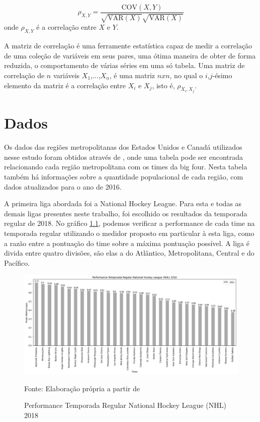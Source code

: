 \documentclass[12pt,oneside,a4paper,chapter=TITLE,english,brazil,sumario=abnt-6027-2012]{abntex2}
\begin{document}
	\begin{equation}
		\rho_{X,Y} = \frac{\mbox{COV}(X,Y)}{\sqrt{\mbox{VAR}(X)}\sqrt{\mbox{VAR}(X)}}
		\label{corr}
	\end{equation}
	onde $\rho_{X,Y}$ é a correlação entre $X$ e $Y$.
	
	A matriz de correlação é uma ferramente estatística capaz de medir a correlação de uma coleção de variáveis em seus pares, uma ótima maneira de obter de forma reduzida, o comportamento de várias séries em uma só tabela. Uma matriz de correlação de $n$ variáveis $X_1$,...,$X_n$, é uma matriz $nxn$, no qual o $i$,$j$-ésimo elemento da matriz é a correlação entre $X_i$ e $X_j$, isto é, $\rho_{X_i,X_j}$.
	
	
\chapter{Dados}

	Os dados das regiões metropolitanas dos Estados Unidos e Canadá utilizados nesse estudo foram obtidos através de , onde uma tabela pode ser encontrada relacionando cada região metropolitana com os times da big four. Nesta tabela também há informações sobre a quantidade populacional de cada região, com dados atualizados para o ano de 2016.
	
	A primeira liga abordada foi a National Hockey League. Para esta e todas as demais ligas presentes neste trabalho, foi escolhido os resultados da temporada regular de 2018. No gráfico \ref{nhl}, podemos verificar a performance de cada time na temporada regular utilizando o medidor proposto em particular à esta liga, como a razão entre a pontuação do time sobre a máxima pontuação possível. A liga é divida entre quatro divisões, são elas a do Atlântico, Metropolitana, Central e do Pacífico.
	
	\begin{figure}[H]
		\centering
		\caption{Performance Temporada Regular National Hockey League (NHL) 2018}
		\includegraphics[scale=0.4]{../../output/figures/nhl.png}
		\label{nhl}
		\\ \vspace{0.25cm}
		\raggedright
		\footnotesize{Fonte: Elaboração própria a partir de }
	\end{figure}
	
\end{document}
